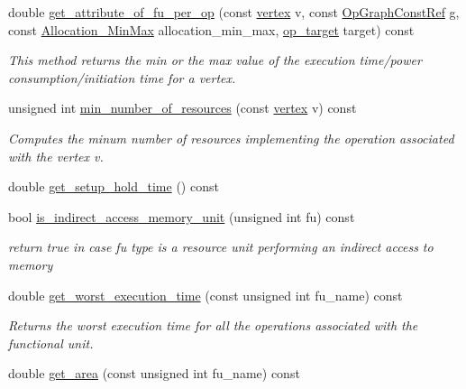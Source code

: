 \begin{DoxyCompactItemize}
double \hyperlink{classAllocationInformation_af971b67971b944136aaef74398f7e90d}{get\+\_\+attribute\+\_\+of\+\_\+fu\+\_\+per\+\_\+op} (const \hyperlink{graph_8hpp_abefdcf0544e601805af44eca032cca14}{vertex} v, const \hyperlink{op__graph_8hpp_a9a0b240622c47584bee6951a6f5de746}{Op\+Graph\+Const\+Ref} g, const \hyperlink{allocation_8hpp_ac615dfccdc03f10d085f4fd1c4c7912b}{Allocation\+\_\+\+Min\+Max} allocation\+\_\+min\+\_\+max, \hyperlink{classAllocationInformation_aab74a04623ed2f1fb1708c8007a1736c}{op\+\_\+target} target) const
\begin{DoxyCompactList}\small\item\em This method returns the min or the max value of the execution time/power consumption/initiation time for a vertex. \end{DoxyCompactList}\item 
unsigned int \hyperlink{classAllocationInformation_a156ffef1d503c9b31d53d40a6a1501a8}{min\+\_\+number\+\_\+of\+\_\+resources} (const \hyperlink{graph_8hpp_abefdcf0544e601805af44eca032cca14}{vertex} v) const
\begin{DoxyCompactList}\small\item\em Computes the minum number of resources implementing the operation associated with the vertex v. \end{DoxyCompactList}\item 
double \hyperlink{classAllocationInformation_a29ab49e3d2401690bd30b11de24294cb}{get\+\_\+setup\+\_\+hold\+\_\+time} () const
\item 
bool \hyperlink{classAllocationInformation_a78857c97df2c595abff1d03c6a6c3a87}{is\+\_\+indirect\+\_\+access\+\_\+memory\+\_\+unit} (unsigned int fu) const
\begin{DoxyCompactList}\small\item\em return true in case fu type is a resource unit performing an indirect access to memory \end{DoxyCompactList}\item 
double \hyperlink{classAllocationInformation_ac059b480028b8c93e67313eb73b52c88}{get\+\_\+worst\+\_\+execution\+\_\+time} (const unsigned int fu\+\_\+name) const
\begin{DoxyCompactList}\small\item\em Returns the worst execution time for all the operations associated with the functional unit. \end{DoxyCompactList}\item 
double \hyperlink{classAllocationInformation_a200074a0f73ed6e067be0d668517b7a5}{get\+\_\+area} (const unsigned int fu\+\_\+name) const

\end{DoxyCompactItemize}
